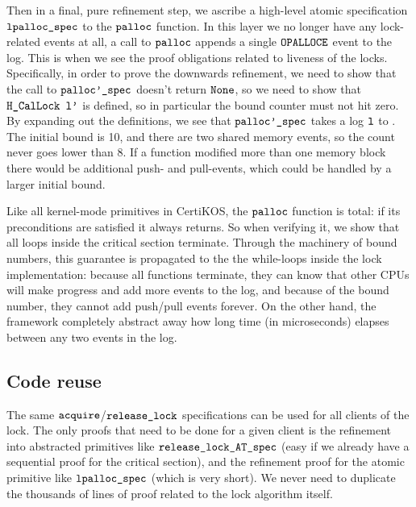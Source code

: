 Then in a final, pure refinement step, we ascribe a high-level atomic
specification ${\mathrm{\texttt{lpalloc\_spec}}}$ to the ${\mathrm{\texttt{palloc}}}$
function. In this layer we no longer have any lock-related events at
all, a call to ${\mathrm{\texttt{palloc}}}$ appends a single
${\mathrm{\texttt{OPALLOCE}}}$ event to the log. This is when we see the
proof obligations related to liveness of the locks.
Specifically, in order to prove the downwards refinement, we need to
show that the call to ${\mathrm{\texttt{palloc'\_spec}}}$ doesn't return
${\mathrm{\texttt{None}}}$, so we need to show that ${\mathrm{\texttt{H\_CalLock l'}}}$ is
defined, so in particular the bound counter must not hit zero.
By expanding out the definitions, we see that
${\mathrm{\texttt{palloc'\_spec}}}$ takes a log ${\mathrm{\texttt{l}}}$ to
.
The initial bound is 10, and there are two shared memory events, so the
count never goes lower than 8. If a function modified more than one
memory block there would be additional push- and pull-events, which
could be handled by a larger initial bound.

Like all kernel-mode primitives in CertiKOS, the ${\mathrm{\texttt{palloc}}}$ function is
total: if its preconditions are satisfied it always returns. So
when verifying it, we show that all loops inside the critical section
terminate. Through the machinery of bound numbers, this guarantee is
propagated to the the while-loops inside the lock implementation:
because all functions terminate, they can know that other CPUs will
make progress and add more events to the log, and because of the
bound number, they cannot add push/pull events forever. On the other
hand, the framework completely abstract away how long time (in microseconds) elapses
between any two events in the log.

\subsection{Code reuse} 
The same
${\mathrm{\texttt{acquire}}}$/${\mathrm{\texttt{release\_lock}}}$ specifications can be
used for all clients of the lock. The only proofs that need to be done
for a given client is the refinement into abstracted primitives like
${\mathrm{\texttt{release\_lock\_AT\_spec}}}$ (easy if we already have a sequential
proof for the critical section), and the refinement proof for the
atomic primitive like ${\mathrm{\texttt{lpalloc\_spec}}}$ (which is very
short). We never need to duplicate the thousands of lines of proof
related to the lock algorithm itself.

